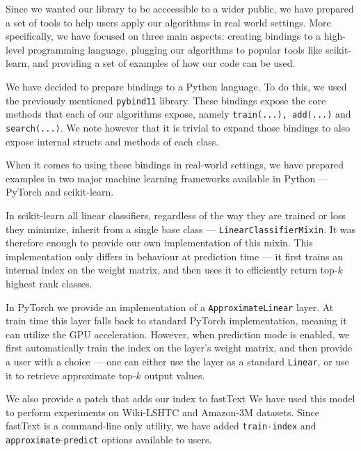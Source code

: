 Since we wanted our library to be acceessible to a wider public, we have prepared
a set of tools to help users apply our algorithms in real world settings. More specifically,
we have focused on three main aspects: creating bindings to a high-level programming language,
plugging our algorithms to popular tools like scikit-learn, and providing a set
of examples of how our code can be used.

We have decided to prepare bindings to a Python language. To do this, we used
the previously mentioned \texttt{pybind11} library. These bindings expose the core methods that
each of our algorithms expose, namely \texttt{train(...), add(...)} and \texttt{search(...)}.
We note however that it is trivial to expand those bindings to also expose internal
structs and methods of each class.

When it comes to using these bindings in real-world settings, we have prepared examples
in two major machine learning frameworks available in Python --- PyTorch
and scikit-learn.

In scikit-learn all linear classifiers, regardless of the way they are trained
or loss they minimize, inherit from a single base class --- \texttt{LinearClassifierMixin}.
It was therefore enough to provide our own implementation of this mixin. This implementation
only differs in behaviour at prediction time --- it first trains an internal index on the
weight matrix, and then uses it to efficiently return top-$k$ highest rank classes.

In PyTorch we provide an implementation of a \texttt{ApproximateLinear} layer.
At train time this layer falls back to standard PyTorch implementation, meaning
it can utilize the GPU acceleration. However, when prediction mode is enabled, we first
automatically train the index on the layer's weight matrix, and then provide a user with
a choice --- one can either use the layer as a standard \texttt{Linear}, or use it
to retrieve approximate top-$k$ output values.

We also provide a patch that adds our index to fastText
We have used this model to perform experiments on Wiki-LSHTC and Amazon-3M datasets.
Since fastText is a command-line only utility, we have added \texttt{train-index}
and \texttt{approximate}-\texttt{predict} options available to users.

